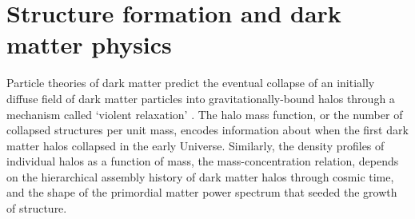 \section{Structure formation and dark matter physics}
\indent Particle theories of dark matter predict the eventual collapse of an initially diffuse field of dark matter particles into gravitationally-bound halos through a mechanism called `violent relaxation' \cite{LyndenBell67}. The halo mass function, or the number of collapsed structures per unit mass, encodes information about when the first dark matter halos collapsed in the early Universe. Similarly, the density profiles of individual halos as a function of mass, the mass-concentration relation, depends on the hierarchical assembly history of dark matter halos through cosmic time, and the shape of the primordial matter power spectrum that seeded the growth of structure. 

